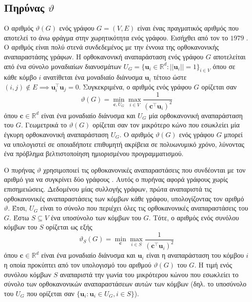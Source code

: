 \subsection{Πηρύνας  $\vartheta$}
Ο αριθμός  $\vartheta(G)$ ενός γράφου $G=(V,E)$ είναι ένας πραγματικός αριθμός που αποτελεί το άνω φράγμα στην χωρητικότητα  ενός γράφου.
Εισήχθει από τον  το $1979$ \cite{lovasz1979shannon}.
Ο αριθμός  είναι πολύ στενά συνδεδεμένος με την έννοια της ορθοκανονικής αναπαραστάσης γράφων.
Η ορθοκανονική αναπαράσταση ενός γράφου $G$ αποτελείται από ένα σύνολο μοναδιαίων διανυσμάτων $U_G = \{ \mathbf{u}_i \in \mathbb{R}^d : || \mathbf{u}_i || = 1 \}_{i \in V}$ όπου σε κάθε κόμβο $i$ ανατίθεται ένα μοναδιαίο διάνυσμα $\mathbf{u}_i$ τέτοιο ώστε $(i,j) \not \in E \implies \mathbf{u}_i^\top \mathbf{u}_j = 0$.
Συγκεκριμένα, ο αριθμός  ενός γράφου $G$ ορίζεται σαν
\begin{equation}
    \vartheta(G) = \min_{\mathbf{c}, U_G} \max_{i \in V} \frac{1}{(\mathbf{c}^\top \mathbf{u}_i)^2}
\end{equation}
όπου $\mathbf{c} \in \mathbb{R}^d$ είναι ένα μοναδιαίο διάνυσμα και $U_G$ μία ορθοκανονική αναπαράσταση του $G$. 
Γεωμετρικά το $\vartheta(G)$ ορίζεται σαν τον μικρότερο κώνο που εσωκλείει μία έγκυρη ορθοκανονική αναπαράσταση $U_G$.
Ο αριθμός  $\vartheta(G)$ ενός γράφου $G$ μπορεί να υπολογιστεί σε οποιαδήποτε επιθυμητή ακρίβεια σε πολυωνυμικό χρόνο, λύνοντας ένα πρόβλημα βελτιστοποίηση ημιορισμένου προγραμματισμού.

Ο πυρήνας  $\vartheta$ χρησιμοποιεί τις ορθοκανονικές αναπαραστάσεις που συνδέονται με τον αριθμό  για να συγκρίνει δύο γράφους \cite{johansson2014global}.
Αυτός ο πυρήνας αφορά γράφους χωρίς επισημειώσεις.
Δεδομένου μίας συλλογής γράφων, πρώτα αναπαριστά τις ορθοκανονικές αναπαραστάσεις των κόμβων κάθε γράφου, υπολογίζοντας τον αριθμό  $\vartheta$.
Έτσι, $U_G$ είναι το σύνολο που περιέχει όλες τις ορθοκανονικές αναπαραστάσεις του $G$.
Έστω $S \subseteq V$ ένα υποσύνολο των κόμβων του $G$.
Τότε, ο αριθμός  ενός συνόλου κόμβων του $S$ ορίζεται ως εξής
\begin{equation}
    \vartheta_S(G) = \min_{\mathbf{c}} \max_{i \in S} \frac{1}{(\mathbf{c}^\top \mathbf{u}_i)^2}
\end{equation}
όπου $\mathbf{c} \in \mathbb{R}^d$ είναι ένα μοναδιαίο διάνυσμα και $\mathbf{u}_i$ είναι η αναπαράσταση του κόμβου $i$ η οποία προκύπτει από τον υπολογισμό του αριθμού  $\vartheta(G)$ του $G$.
Η τιμή  ενός συνόλου κόμβων $S$ αναπαριστά την γωνία του μικρότερου κώνου που εσωκλείει το σύνολο των ορθοκανονικών αναπαραστάσεων αυτών των κόμβων (δηλ. το υποσύνολο του $U_G$ που ορίζεται σαν $\{ \mathbf{u}_i : \mathbf{u}_i \in U_G, i \in S \}$).

